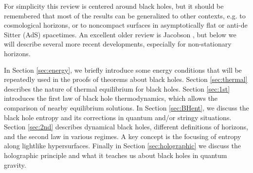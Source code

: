\documentclass[12pt,a4paper]{article}
\def\be{\begin{equation}}
\def\ee{\end{equation}}
\begin{document}
For simplicity this review is centered around black holes, but it should be remembered that most of the results can be generalized to other contexts, e.g. to cosmological horizons, or to noncompact surfaces in asymptotically flat or anti-de Sitter (AdS) spacetimes. An excellent older review is Jacobson \cite{Jacobson}, but below we will describe several more recent developments, especially for non-stationary horizons.

In Section \ref{sec:energy}, we briefly introduce some energy conditions that will be repeatedly used in the proofs of theorems about black holes. Section \ref{sec:thermal} describes the nature of thermal equilibrium for black holes. Section \ref{sec:1st} introduces the first law of black hole thermodynamics, which allows the comparison of nearby equilibrium solutions. In Section \ref{sec:BHent}, we discuss the black hole entropy and its corrections in quantum and/or stringy situations. Section \ref{sec:2nd} describes dynamical black holes, different definitions of horizons, and the second law in various regimes. A key concept is the focusing of entropy along lightlike hypersurfaces.  Finally in Section \ref{sec:holographic} we discuss the holographic principle and what it teaches us about black holes in quantum gravity.

%
%
\end{document}
